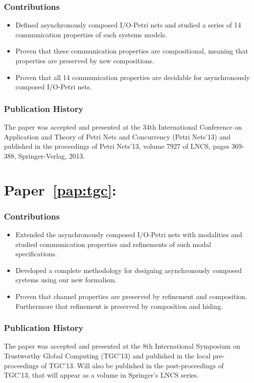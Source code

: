 \noindent

\subsubsection*{Contributions}

\begin{itemize}
\item Defined asynchronously composed I/O-Petri nets and studied a series of 14 communication properties of such systems models.
\item Proven that these communication properties are compositional, meaning that properties are preserved by new compositions.
\item Proven that all 14 communication properties are decidable for asynchronously composed I/O-Petri nets.
\end{itemize}

\subsubsection*{Publication History}

The paper was accepted and presented at the 34th International Conference on 
Application and Theory of Petri Nets and Concurrency (Petri Nets'13) and published in the proceedings of Petri Nets'13, volume 7927 of LNCS, pages 369-388, Springer-Verlag, 2013.


\newpage

\section*{Paper~\ref{pap:tgc}: \tgc}
\serge \rolf \mhm
\vspace{3mm}

\noindent

\subsubsection*{Contributions}

\begin{itemize}
\item Extended the asynchronously composed I/O-Petri nets with modalities and studied communication properties and refinements of such modal specifications.
\item Developed a complete methodology for designing asynchronously composed systems using our new formalism.
\item Proven that channel properties are preserved by refinement and composition. Furthermore that refinement is preserved by composition and hiding.
\end{itemize}

\subsubsection*{Publication History}

The paper was accepted and presented at the 8th International Symposium on Trustworthy Global Computing (TGC'13) and published in the local pre-proceedings of TGC'13. Will also be published in the post-proceedings of TGC'13, that will appear as a volume in Springer's LNCS series.